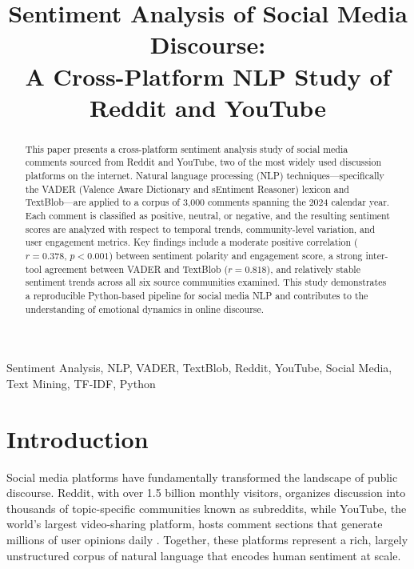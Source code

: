 \documentclass[conference]{IEEEtran}
\begin{document}
\title{Sentiment Analysis of Social Media Discourse:\\
A Cross-Platform NLP Study of Reddit and YouTube}

\author{
}

\maketitle

\begin{abstract}
This paper presents a cross-platform sentiment analysis study of social media
comments sourced from Reddit and YouTube, two of the most widely used
discussion platforms on the internet. Natural language processing (NLP)
techniques---specifically the VADER (Valence Aware Dictionary and sEntiment
Reasoner) lexicon and TextBlob---are applied to a corpus of 3{,}000 comments
spanning the 2024 calendar year. Each comment is classified as positive,
neutral, or negative, and the resulting sentiment scores are analyzed with
respect to temporal trends, community-level variation, and user engagement
metrics. Key findings include a moderate positive correlation ($r = 0.378$,
$p < 0.001$) between sentiment polarity and engagement score, a strong
inter-tool agreement between VADER and TextBlob ($r = 0.818$), and relatively
stable sentiment trends across all six source communities examined. This
study demonstrates a reproducible Python-based pipeline for social media NLP
and contributes to the understanding of emotional dynamics in online discourse.
\end{abstract}

\begin{IEEEkeywords}
Sentiment Analysis, NLP, VADER, TextBlob, Reddit, YouTube, Social Media,
Text Mining, TF-IDF, Python
\end{IEEEkeywords}

\section{Introduction}

Social media platforms have fundamentally transformed the landscape of public
discourse. Reddit, with over 1.5 billion monthly visitors, organizes
discussion into thousands of topic-specific communities known as subreddits,
while YouTube, the world's largest video-sharing platform, hosts comment
sections that generate millions of user opinions daily \cite{reddit_stats,
youtube_stats}. Together, these platforms represent a rich, largely
unstructured corpus of natural language that encodes human sentiment at scale.
\end{document}
